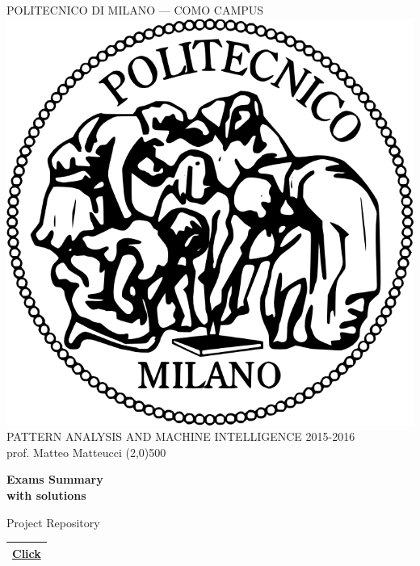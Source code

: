 \documentclass[a4paper,12pt,titlepage]{article} %
\begin{document}
	\begin{titlepage}
		
		\begin{center}
			POLITECNICO DI MILANO --- COMO CAMPUS\\
			\vspace{10pt}
			\includegraphics[scale=0.1]{logo-polimi.png}\\
			\vspace{10pt}
			PATTERN ANALYSIS AND MACHINE INTELLIGENCE 2015-2016\\
			prof. Matteo Matteucci	
			\line(2,0){500}
		\end{center}
		
		\vspace{60pt}	
		\begin{center}
			{\Huge \textbf{Exams Summary}}\\
			\vspace{20pt}
			{\large \textbf{with solutions}}\\
		\end{center}
		
		\vspace{60pt}
		
		\begin{center}
			{\large Project Repository}
		\end{center}
		\begin{tabularx}{\textwidth}{|X|}
			\hline
			\href{https://github.com/attillax/PAMI-2015}{Click}\\
			\hline
		\end{tabularx}
		

\end{titlepage}
\end{document}
